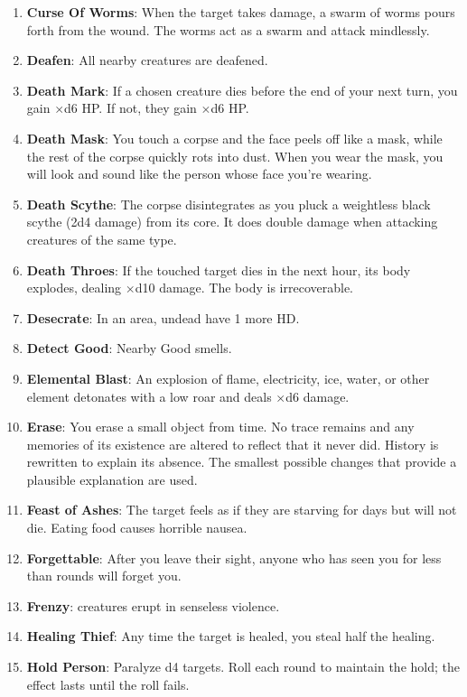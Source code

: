 \documentclass[twoside]{article}
\newcommand{\lle}{\raisebox{\depth}{\rotatebox{180}{$\ell$}}}
\begin{document}
\begin{enumerate}[nosep]
\item \textbf{Curse Of Worms}: When the target takes damage, a swarm of worms pours forth from the wound. The worms act as a swarm and attack mindlessly.
\item \textbf{Deafen}: All nearby creatures are deafened.
\item \textbf{Death Mark}: If a chosen creature dies before the end of your next turn, you gain \lle$\times$d6 HP. If not, they gain \lle$\times$d6 HP.
\item \textbf{Death Mask}: You touch a corpse and the face peels off like a mask, while the rest of the corpse quickly rots into dust. When you wear the mask, you will look and sound like the person whose face you're wearing.
\item \textbf{Death Scythe}: The corpse disintegrates as you pluck a weightless black scythe (2d4 damage) from its core. It does double damage when attacking creatures of the same type.
\item \textbf{Death Throes}: If the touched target dies in the next hour, its body explodes, dealing \lle$\times$d10 damage. The body is irrecoverable.
\item \textbf{Desecrate}: In an area, undead have 1 more HD.
\item \textbf{Detect Good}: Nearby Good smells.
\item \textbf{Elemental Blast}: An explosion of flame, electricity, ice, water, or other element detonates with a low roar and deals \lle$\times$d6 damage.
\item \textbf{Erase}: You erase a small object from time. No trace remains and any memories of its existence are altered to reflect that it never did. History is rewritten to explain its absence. The smallest possible changes that provide a plausible explanation are used.
\item \textbf{Feast of Ashes}: The target feels as if they are starving for \lle{} days but will not die. Eating food causes horrible nausea.
\item \textbf{Forgettable}: After you leave their sight, anyone who has seen you for less than \lle{} rounds will forget you.
\item \textbf{Frenzy}: \lle{} creatures erupt in senseless violence.
\item \textbf{Healing Thief}: Any time the target is healed, you steal half the healing.
\item \textbf{Hold Person}: Paralyze d4 targets. Roll each round to maintain the hold; the effect lasts until the roll fails.

\end{enumerate}
\end{document}
